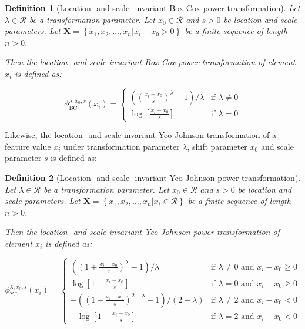 \documentclass[
  a4paper,
]{article}
\newtheorem*{definition}{Definition}
\begin{document}
\begin{definition}[Location- and scale- invariant Box-Cox power transformation]
Let $\lambda \in \mathcal{R}$ be a transformation parameter.
Let $x_0 \in \mathcal{R}$ and $s > 0$ be location and scale parameters.
Let $\mathbf{X} = \left\{x_1, x_2, \ldots, x_n | x_i - x_0 > 0 \right\}$ be a finite sequence of length $n > 0$.

Then the location- and scale-invariant Box-Cox power transformation of element $x_i$ is defined as:

\begin{equation}
\label{eqn:box-cox-invariant}
\phi_{\text{BC}}^{\lambda, x_0, s} (x_i) = 
\begin{cases}
\left( \left(\frac{x_i - x_0}{s} \right)^\lambda - 1 \right) / \lambda & \text{if } \lambda \neq 0\\
\log\left[\frac{x_i - x_0}{s}\right] & \text{if } \lambda = 0
\end{cases}
\end{equation}
\end{definition}

Likewise, the location- and scale-invariant Yeo-Johnson transformation
of a feature value \(x_i\) under transformation parameter \(\lambda\),
shift parameter \(x_0\) and scale parameter \(s\) is defined as:

\begin{definition}[Location- and scale- invariant Yeo-Johnson power transformation]
Let $\lambda \in \mathcal{R}$ be a transformation parameter.
Let $x_0 \in \mathcal{R}$ and $s > 0$ be location and scale parameters.
Let $\mathbf{X} = \left\{x_1, x_2, \ldots, x_n | x_i \in \mathcal{R} \right\}$ be a finite sequence of length $n > 0$.

Then the location- and scale-invariant Yeo-Johnson power transformation of element $x_i$ is defined as:

\begin{equation}
\label{eqn:yeo-johnson-invariant}
\phi_{\text{YJ}}^{\lambda, x_0, s} (x_i) = 
\begin{cases}
\left( \left( 1 + \frac{x_i - x_0}{s}\right)^\lambda - 1\right) / \lambda & \text{if } \lambda \neq 0 \text{ and } x_i - x_0 \geq 0\\
\log\left[1 + \frac{x_i - x_0}{s}\right] & \text{if } \lambda = 0 \text{ and } x_i - x_0 \geq 0\\
-\left( \left( 1 - \frac{x_i - x_0}{s}\right)^{2 - \lambda} - 1 \right) / \left(2 - \lambda \right) & \text{if } \lambda \neq 2 \text{ and } x_i - x_0 < 0\\
-\log\left[1 - \frac{x_i - x_0}{s}\right] & \text{if } \lambda = 2 \text{ and } x_i - x_0 < 0
\end{cases}
\end{equation}
\end{definition}
\end{document}
